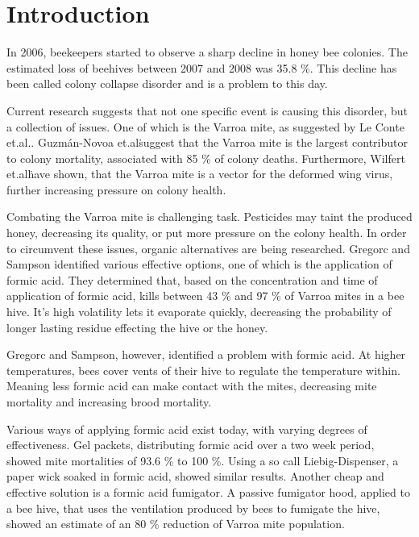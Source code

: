 \section{Introduction}\label{sec:introduction}

In 2006, beekeepers started to observe a sharp decline in honey bee colonies\cite{ColonyCollapseDisorder}.
The estimated loss of beehives between 2007 and 2008 was 35.8 \%.
This decline has been called colony collapse disorder and is a problem to this day.

Current research suggests that not one specific event is causing this disorder, but a collection of issues\cite{VarroaMitesAndHoneyBeeHealth}.
One of which is the Varroa mite, as suggested by Le Conte et.al.\cite{VarroaMitesAndHoneyBeeHealth}.
Guzmán-Novoa et.al\. suggest that the Varroa mite is the largest contributor to colony mortality, associated with 85 \% of colony deaths\cite{VarroaDestructorIsTheMainCulprit}.
Furthermore, Wilfert et.al\. have shown, that the Varroa mite is a vector for the deformed wing virus, further increasing pressure on colony health\cite{DeformedWingVirusDueToVarroa}.

Combating the Varroa mite is challenging task.
Pesticides may taint the produced honey, decreasing its quality, or put more pressure on the colony health\cite{PesticidesInHoney}.
In order to circumvent these issues, organic alternatives are being researched.
Gregorc and Sampson identified various effective options, one of which is the application of formic acid\cite{DiagnosisOfVarroaMiteAndSustainableControl}.
They determined that, based on the concentration and time of application of formic acid, kills between 43 \% and 97 \% of Varroa mites in a bee hive.
It's high volatility lets it evaporate quickly, decreasing the probability of longer lasting residue effecting the hive or the honey.

Gregorc and Sampson, however, identified a problem with formic acid\cite{DiagnosisOfVarroaMiteAndSustainableControl}.
At higher temperatures, bees cover vents of their hive to regulate the temperature within.
Meaning less formic acid can make contact with the mites, decreasing mite mortality and increasing brood mortality.

Various ways of applying formic acid exist today, with varying degrees of effectiveness.
Gel packets, distributing formic acid over a two week period, showed mite mortalities of 93.6 \% to 100 \%\cite{FormicAcidBasedTreatments}.
Using a so call Liebig-Dispenser, a paper wick soaked in formic acid, showed similar results\cite{FormicAcidBasedTreatments}.
Another cheap and effective solution is a formic acid fumigator\cite{FormicAcidFumigator}.
A passive fumigator hood, applied to a bee hive, that uses the ventilation produced by bees to fumigate the hive, showed an estimate of an 80 \% reduction of Varroa mite population.

